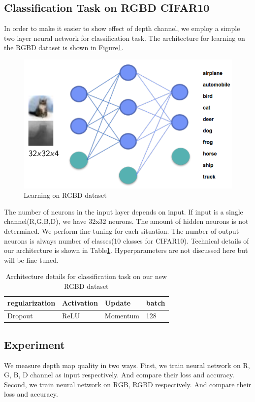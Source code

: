 \documentclass[10pt,twocolumn,letterpaper]{article}
\begin{document}
\subsection{Classification Task on RGBD CIFAR10}
In order to make it easier to show effect of depth channel,
 we employ a simple two layer neural network for classification task.
 The architecture for learning on the RGBD dataset is shown in Figure\ref{fig:tarch}. 
 \begin{figure}
\includegraphics[width=\linewidth]{../Tarch.png}
\caption{Learning on RGBD dataset}
\label{fig:tarch}
\end{figure}
The number of neurons in the input layer depends on input.
If input is a single channel(R,G,B,D), we have 32x32 neurons.
The amount of hidden neurons is not determined. We perform fine tuning 
for each situation. The number of output neurons is always number of classes(10 classes
for CIFAR10). Technical details of our architecture is shown in Table\ref{tab:details}. 
Hyperparameters are not discussed here but will be fine tuned.
\begin{table}
\begin{center}
\begin{tabular}{|l|l|l|l|}
\hline
regularization&Activation&Update&batch\\
\hline
Dropout&ReLU&Momentum&128\\
\hline
\end{tabular}
\end{center}
\caption{Architecture details for classification task on our new RGBD dataset}
\label{tab:details}
\end{table}


\subsection{Experiment}
We measure depth map quality in two ways. 
First, we train neural network on R, G, B, D channel as input respectively.
And compare their loss and accuracy. 
Second, we train neural network on RGB, RGBD respectively. 
And compare their loss and accuracy.
\end{document}
